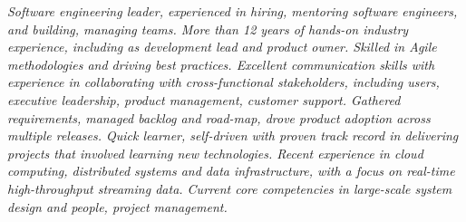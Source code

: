{\selectfont
	\begin{justify}\textit{Software engineering leader, experienced in hiring, mentoring software engineers, and building, managing teams. More than 12 years of hands-on industry experience, including as development lead and product owner. Skilled in Agile methodologies and driving best practices. Excellent communication skills with experience in collaborating with cross-functional stakeholders, including users, executive leadership, product management, customer support. Gathered requirements, managed backlog and road-map, drove product adoption across multiple releases. Quick learner, self-driven with proven track record in delivering projects that involved learning new technologies. Recent experience in cloud computing, distributed systems and data infrastructure, with a focus on real-time high-throughput streaming data. Current core competencies in large-scale system design and people, project management.}\end{justify}
}
